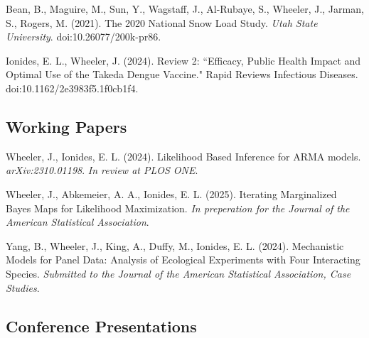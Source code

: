 \documentclass[11pt]{article}
\newenvironment {reflist}
                {
                 \begin{list}{}
                 {\setlength{\labelwidth}{0mm}
                  \setlength{\leftmargin}{8mm}
                  \setlength{\itemindent}{-3mm}
                  \setlength{\labelsep}{0mm}
                  \setlength{\parsep}{0.1 ex}
                  \setlength{\itemsep}{0.1cm}
      \setlength{\topsep}{0.15cm}}} %
   {\end{list}}
\begin{document}
\begin{reflist}

    \item Bean, B., Maguire, M., Sun, Y., Wagstaff, J., Al-Rubaye, S., Wheeler, J., Jarman, S., Rogers, M. (2021). The 2020 National Snow Load Study. {\it Utah State University}. doi:10.26077/200k-pr86.

    \item Ionides, E. L., Wheeler, J. (2024). Review 2: ``Efficacy, Public Health Impact and Optimal Use of the Takeda Dengue Vaccine." Rapid Reviews Infectious Diseases. doi:10.1162/2e3983f5.1f0cb1f4.

\end{reflist}

\subsection*{Working Papers}

\begin{reflist}

    \item Wheeler, J., Ionides, E. L. (2024). Likelihood Based Inference for ARMA models. {\it arXiv:2310.01198}. {\it In review at PLOS ONE}.

    \item Wheeler, J., Abkemeier, A. A., Ionides, E. L. (2025). Iterating Marginalized Bayes Maps for Likelihood Maximization. {\it In preperation for the Journal of the American Statistical Association}.


    \item Yang, B., Wheeler, J., King, A., Duffy, M., Ionides, E. L. (2024). Mechanistic Models for Panel Data: Analysis of Ecological Experiments with Four Interacting Species. {\it Submitted to the Journal of the American Statistical Association, Case Studies}.

\end{reflist}

\subsection*{Conference Presentations}
\end{document}
